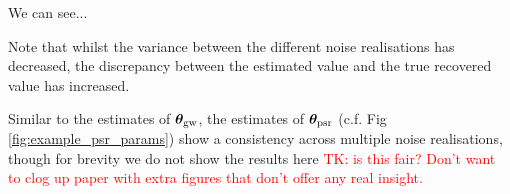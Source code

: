 \documentclass[fleqn,usenatbib,useAMS]{mnras}
\begin{document}
We can see... \newline 




Note that whilst the variance between the different noise realisations has decreased, the discrepancy between the estimated value and the true recovered value has increased.











Similar to the estimates of $\boldsymbol{\theta}_{\rm gw}$, the estimates of $\boldsymbol{\theta}_{\rm psr}$ (c.f.  Fig \ref{fig:example_psr_params}) show a consistency across multiple noise realisations, though for brevity we do not show the results here \textcolor{red}{TK: is this fair? Don't want to clog up paper with extra figures that don't offer any real insight.} \newline 
\end{document}
